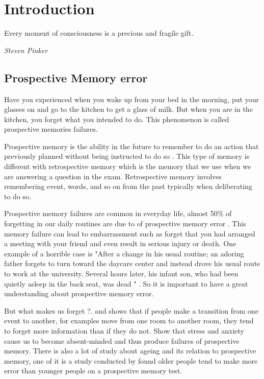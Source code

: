 
\chapter{Introduction}
 \epigraph{Every moment of consciousness is a precious and fragile gift.}{\textit{Steven Pinker}}

\section{Prospective Memory error}


Have you experienced when you wake up from your bed in the morning, put your glasses on and
go to the kitchen to get a glass of milk. But when you are in the kitchen, you forget what
you intended to do. This phenomenon is called prospective memories failures.

Prospective memory is the ability in the future to remember to do an action that previously planned without being instructed to do so \citep{GROOT2002}. This type of memory is different with retrospective memory which is the memory that we use when we are answering a question in the exam. Retrospective memory involves remembering event, words, and so on from the past typically when deliberating to do so.

Prospective memory failures are common in everyday life, almost 50\% of forgetting in our daily routines are due to of prospective
memory error \citep{Crovitz1984}. This memory failure can lead to embarrassment such as forget that you had arranged a meeting with your friend and even result in
serious injury or death. One example of a horrible case is "After a change in his usual routine; an
adoring father forgets to turn toward the daycare center and instead drove his usual route to work
at the university. Several hours later, his infant son, who had been quietly asleep in the back seat,
was dead " \citep{Einstein2005}. So it is important to have a great understanding about prospective memory error.

But what makes us forget ?. \cite{Radvansky2006} and \cite{Radvansky2010} shows that if people make a transition from one event to another, for examples move
from one room to another room, they tend to forget more information than if they do not.
\cite{Cockburn1994} Show that stress and anxiety cause us to become absent-minded and
thus produce failures of prospective memory. There is also a lot of study about ageing and its relation to prospective memory, one of it is a study conducted by \cite{Scullin2012} found older people tend to make more error than younger people on a prospective memory test.

